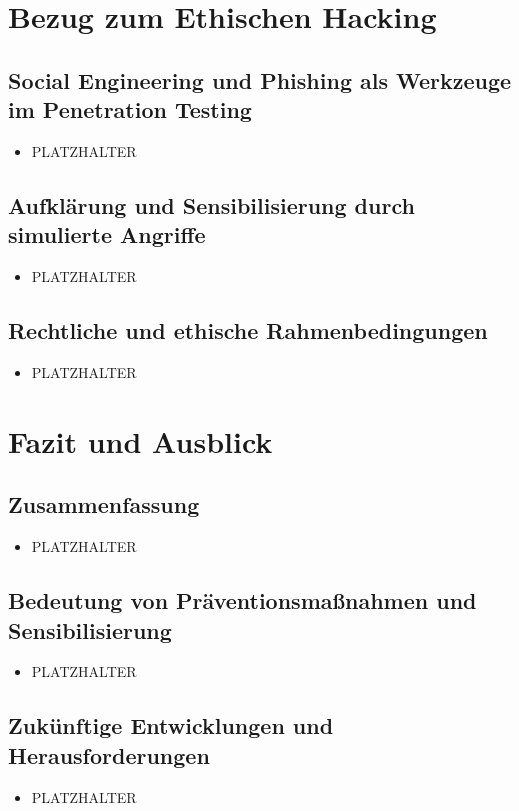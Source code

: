 \documentclass[12pt, a4paper, oneside]{scrartcl}
\begin{document}
\clearpage
\section{Bezug zum Ethischen Hacking}

\subsection{Social Engineering und Phishing als Werkzeuge im Penetration Testing}
\begin{itemize}
  \item PLATZHALTER
\end{itemize}

\subsection{Aufklärung und Sensibilisierung durch simulierte Angriffe}
\begin{itemize}
  \item PLATZHALTER
\end{itemize}

\subsection{Rechtliche und ethische Rahmenbedingungen}
\begin{itemize}
  \item PLATZHALTER
\end{itemize}

\clearpage
\section{Fazit und Ausblick}

\subsection{Zusammenfassung}
\begin{itemize}
  \item PLATZHALTER
\end{itemize}

\subsection{Bedeutung von Präventionsmaßnahmen und Sensibilisierung}
\begin{itemize}
  \item PLATZHALTER
\end{itemize}

\subsection{Zukünftige Entwicklungen und Herausforderungen}
\begin{itemize}
  \item PLATZHALTER
\end{itemize}

\clearpage
\printbibliography[title={Literaturverzeichnis}]
\end{document}
